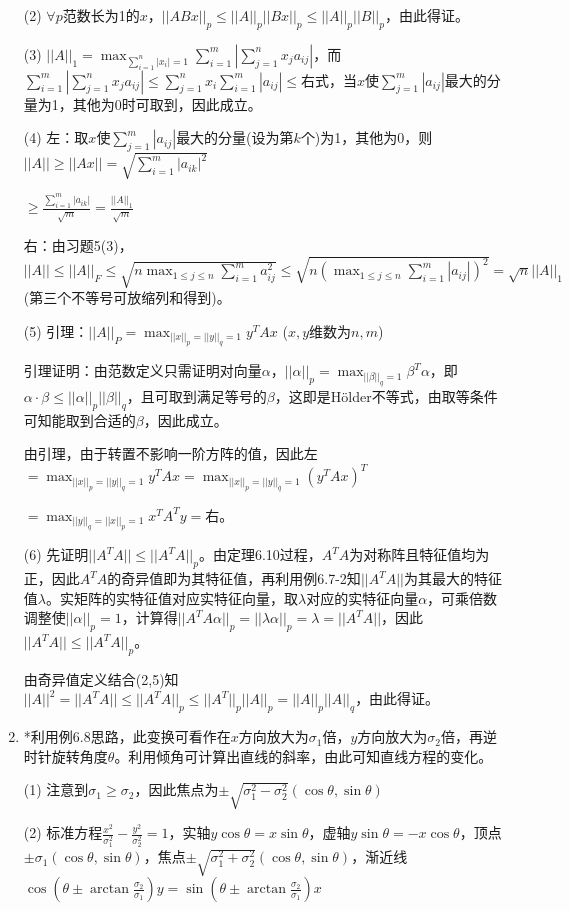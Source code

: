 \documentclass[a4paper,UTF8,fontset=windows]{ctexart}
\begin{document}
\begin{enumerate}
(2) $\forall p$范数长为1的$x$，$||ABx||_p\le||A||_p||Bx||_p\le||A||_p||B||_p$，由此得证。

(3) $||A||_1=\max_{\sum_{i=1}^{n}|x_i|=1}\sum_{i=1}^{m}\left|\sum_{j=1}^{n}{x_ja_{ij}}\right|$，而$\sum_{i=1}^{m}\left|\sum_{j=1}^{n}{x_ja_{ij}}\right|\le\sum_{j=1}^{n}{x_i\sum_{i=1}^{m}\left|a_{ij}\right|}\le$右式，当$x$使$\sum_{j=1}^{m}|a_{ij}|$最大的分量为1，其他为0时可取到，因此成立。

(4) 左：取$x$使$\sum_{j=1}^{m}|a_{ij}|$最大的分量(设为第$k$个)为1，其他为0，则$||A||\ge||Ax||=\sqrt{\sum_{i=1}^m|a_{ik}|^2}$

$\ge\frac{\sum_{i=1}^{m}|a_{ik}|}{\sqrt m}=\frac{||A||_1}{\sqrt m}$

右：由习题5(3)，$||A||\le||A||_F\le\sqrt{n\max_{1\le j\le n}{\sum_{i=1}^{m}a_{ij}^2}}\le\sqrt{n\left(\max_{1\le j\le n}{\sum_{i=1}^{m}|a_{ij}|}\right)^2}=\sqrt n||A||_1$ (第三个不等号可放缩列和得到)。

(5) 引理：$||A||_P=\max_{||x||_p=||y||_q=1}y^TAx$ ($x,y$维数为$n,m$)

引理证明：由范数定义只需证明对向量$\alpha$，$||\alpha||_p=\max_{||\beta||_q=1}\beta^T\alpha$，即$\alpha\cdot\beta\le||\alpha||_p||\beta||_q$，且可取到满足等号的$\beta$，这即是H\"older不等式，由取等条件可知能取到合适的$\beta$，因此成立。

由引理，由于转置不影响一阶方阵的值，因此左$=\max_{||x||_p=||y||_q=1}y^TAx=\max_{||x||_p=||y||_q=1}(y^TAx)^T$

$=\max_{||y||_q=||x||_p=1}x^TA^Ty=$右。

(6) 先证明$||A^TA||\le||A^TA||_p$。由定理6.10过程，$A^TA$为对称阵且特征值均为正，因此$A^TA$的奇异值即为其特征值，再利用例6.7-2知$||A^TA||$为其最大的特征值$\lambda$。实矩阵的实特征值对应实特征向量，取$\lambda$对应的实特征向量$\alpha$，可乘倍数调整使$||\alpha||_p=1$，计算得$||A^TA\alpha||_p=||\lambda\alpha||_p=\lambda=||A^TA||$，因此$||A^TA||\le||A^TA||_p$。

由奇异值定义结合(2,5)知$||A||^2=||A^TA||\le||A^TA||_p\le||A^T||_p||A||_p=||A||_p||A||_q$，由此得证。

\item
*利用例6.8思路，此变换可看作在$x$方向放大为$\sigma_1$倍，$y$方向放大为$\sigma_2$倍，再逆时针旋转角度$\theta$。利用倾角可计算出直线的斜率，由此可知直线方程的变化。

(1) 注意到$\sigma_1\ge\sigma_2$，因此焦点为$\pm\sqrt{\sigma_1^2-\sigma_2^2}(\cos\theta,\sin\theta)$

(2) 标准方程$\frac{x^2}{\sigma_1^2}-\frac{y^2}{\sigma_2^2}=1$，实轴$y\cos\theta=x\sin\theta$，虚轴$y\sin\theta=-x\cos\theta$，顶点$\pm\sigma_1(\cos\theta,\sin\theta)$，焦点$\pm\sqrt{\sigma_1^2+\sigma_2^2}(\cos\theta,\sin\theta)$，渐近线$\cos\left(\theta\pm\arctan\frac{\sigma_2}{\sigma_1}\right)y=\sin\left(\theta\pm\arctan\frac{\sigma_2}{\sigma_1}\right)x$


\end{enumerate}
\end{document}
